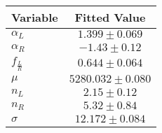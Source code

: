 \begin{tabular}[t]{lc}
\hline
Variable &Fitted Value\\
\hline\hline
$\alpha_L$&$1.399\pm0.069$\\
\hline
$\alpha_R$&$-1.43\pm0.12$\\
\hline
$f_{\frac{L}{R}}$&$0.644\pm0.064$\\
\hline
$\mu$&$5280.032\pm0.080$\\
\hline
$n_L$&$2.15\pm0.12$\\
\hline
$n_R$&$5.32\pm0.84$\\
\hline
$\sigma$&$12.172\pm0.084$\\
\hline
\end{tabular}